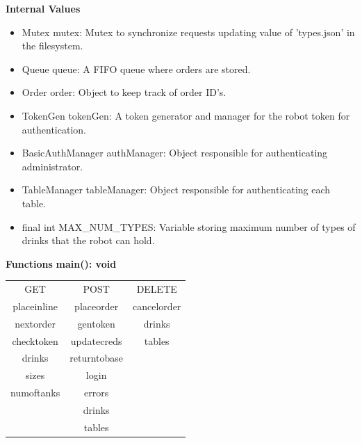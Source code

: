 \documentclass [10pt]{article}
\begin{document}
\textbf{Internal Values}
\begin{itemize}
	\item Mutex mutex: Mutex to synchronize requests updating value of 'types.json' in the filesystem.
	\item Queue queue: A FIFO queue where orders are stored.
	\item Order order: Object to keep track of order ID's.
	\item TokenGen tokenGen: A token generator and manager for the robot token for authentication.
	\item BasicAuthManager authManager: Object responsible for authenticating administrator.
	\item TableManager tableManager: Object responsible for authenticating each table.
	\item final int MAX\_NUM\_TYPES: Variable storing maximum number of types of drinks that the robot can hold.
\end{itemize}

\textbf{Functions}
\textbf{main(): void}

\begin{center}
	\begin{tabular}{ |c|c|c| } 
		\hline
		GET & POST & DELETE \\ 
		placeinline & placeorder & cancelorder \\ 
		nextorder & gentoken & drinks \\ 
		checktoken & updatecreds & tables \\ 
		drinks & returntobase &  \\ 
		sizes & login &  \\ 
		numoftanks & errors &  \\ 
		& drinks &  \\ 
		& tables &  \\ 
		\hline
	\end{tabular}
\end{center}
\end{document}
